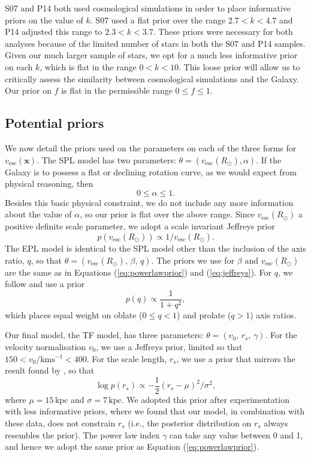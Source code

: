 \documentclass[useAMS,twocolumn,usenatbib]{mn2e}
\def\kpc{{\,\mathrm{kpc}}}
\def\vesc{{v_\mathrm{esc}}}
\def\pos{{\boldsymbol{x}}}
\begin{document}
S07 and P14 both used cosmological simulations in order to place informative priors on the value of $k$. 
S07 used a flat prior over the range $2.7 < k < 4.7$ and P14 adjusted this range to $2.3 < k < 3.7$. 
These priors were necessary for both analyses because of the limited number of stars in both the S07 and P14 samples. 
Given our much larger sample of stars, we opt for a much less informative prior on each $k$, which is flat in the range $0 < k < 10$. 
This loose prior will allow us to critically assess the similarity between cosmological simulations and the Galaxy. 
Our prior on $f$ is flat in the permissible range $0 \leq f \leq 1$.

\subsection{Potential priors}

We now detail the priors used on the parameters on each of the three forms for $\vesc(\pos)$.
The SPL model has two parameters: $\theta = (\vesc(R_\odot),\alpha)$. 
If the Galaxy is to possess a flat or declining rotation curve, as we would expect from physical reasoning, then
%
\begin{equation}
0 \leq \alpha \leq 1.
\label{eq:powerlawprior}
\end{equation}
%
Besides this basic physical constraint, we do not include any more information about the value of $\alpha$, so our prior is flat over the above range. 
Since $\vesc(R_\odot)$ a positive definite scale parameter, we adopt a scale invariant Jeffreys prior
%
\begin{equation}
p\left(\vesc(R_\odot)\right) \propto 1/\vesc(R_\odot).
\label{eq:jeffreys}
\end{equation}
%
The EPL model is identical to the SPL model other than the inclusion of the axis ratio, $q$, so that $\theta = (\vesc(R_\odot),\,\beta,\,q)$. 
The priors we use for $\beta$ and $\vesc(R_\odot)$ are the same as in Equations (\ref{eq:powerlawprior}) and (\ref{eq:jeffreys}). For $q$, we follow \citet{Bo16} and use a prior
%
\begin{equation}
p(q) \propto \dfrac{1}{1+q^2},
\end{equation}
%
which places equal weight on oblate ($0\leq q <1$) and prolate ($q>1$) axis ratios.

Our final model, the TF model, has three parameters: $\theta = (v_0,\,r_s,\,\gamma)$. 
For the velocity normalisation $v_0$, we use a Jeffreys prior, limited so that $150 < v_0/\mathrm{kms^{-1}} < 400$. 
For the scale length, $r_s$, we use a prior that mirrors the result found by \citet{Gi14}, so that
%
\begin{equation}
\log p(r_s) \propto -\dfrac{1}{2}(r_s - \mu)^2 / \sigma^2,
\end{equation}
% 
where $\mu=15\kpc$ and $\sigma=7\kpc$. 
We adopted this prior after experimentation with less informative priors, where we found that our model, in combination with these data, does not constrain $r_s$ (i.e., the posterior distribution on $r_s$ always resembles the prior).
The power law index $\gamma$ can take any value between 0 and 1, and hence we adopt the same prior as Equation (\ref{eq:powerlawprior}).
\end{document}
